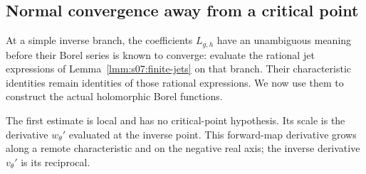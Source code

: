 \documentclass[a4paper,10pt]{article}
\numberwithin{equation}{section}
\theoremstyle{paperplain}
\theoremstyle{paperremark}
\theoremstyle{paperplain}
\begin{document}
\subsection{Normal convergence away from a critical point}
\label{subsec:b:regular}

At a simple inverse branch, the coefficients $L_{g,h}$ have an
unambiguous meaning before their Borel series is known to converge:
evaluate the rational jet expressions of
Lemma~\ref{lmm:s07:finite-jets} on that branch. Their characteristic
identities remain identities of those rational expressions. We now
use them to construct the actual holomorphic Borel functions.

The first estimate is local and has no critical-point hypothesis. Its
scale is the derivative $w_\theta'$ evaluated at the inverse point.
This forward-map derivative grows along a remote characteristic and on
the negative real axis; the inverse derivative $v_\theta'$ is its
reciprocal.
\end{document}
